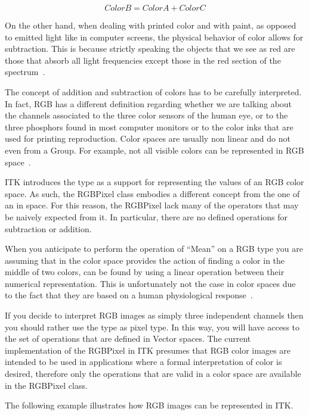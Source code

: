 \begin{equation}
\label{eqn:ColorAddition}
         ColorB = ColorA + ColorC
\end{equation}

On the other hand, when dealing with printed color and with paint, as opposed
to emitted light like in computer screens, the physical behavior of color
allows for subtraction. This is because strictly speaking the objects that we
see as red are those that absorb all light frequencies except those in the red
section of the spectrum~\cite{Wyszecki2000}.

The concept of addition and subtraction of colors has to be carefully
interpreted. In fact, RGB has a different definition regarding whether we are
talking about the channels associated to the three color sensors of the human
eye, or to the three phosphors found in most computer monitors or to the color
inks that are used for printing reproduction.  Color spaces are usually non
linear and do not even from a Group. For example, not all visible colors can be
represented in RGB space~\cite{Wyszecki2000}.

ITK introduces the  type as a support for representing the
values of an RGB color space. As such, the RGBPixel class embodies a different
concept from the one of an  in space. For this reason, the
RGBPixel lack many of the operators that may be naively expected from it. In
particular, there are no defined operations for subtraction or addition.

When you anticipate to perform the operation of ``Mean'' on a RGB type you are
assuming that in the color space provides the action of finding a color in the
middle of two colors, can be found by using a linear operation between their
numerical representation. This is unfortunately not the case in  color spaces
due to the fact that they are based on a human physiological
response~\cite{Malacara2002}.

If you decide to interpret RGB images as simply three independent channels then
you should rather use the  type as pixel type. In this way, you
will have access to the set of operations that are defined in Vector spaces.
The current implementation of the RGBPixel in ITK presumes that RGB color
images are intended to be used in applications where a formal interpretation of
color is desired, therefore only the operations that are valid in a color space
are available in the RGBPixel class.

The following example illustrates how RGB images can be represented in ITK.

